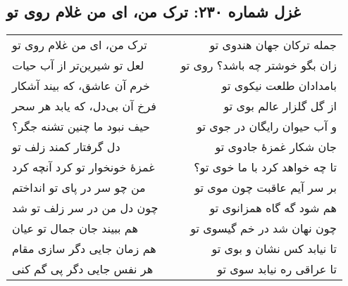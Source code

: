\begin{center}
\section*{غزل شماره ۲۳۰: ترک من، ای من غلام روی تو}
\label{sec:230}
\begin{longtable}{l p{0.5cm} r}
ترک من، ای من غلام روی تو
&&
جمله ترکان جهان هندوی تو
\\
لعل تو شیرین‌تر از آب حیات
&&
زان بگو خوشتر چه باشد؟ روی تو
\\
خرم آن عاشق، که بیند آشکار
&&
بامدادان طلعت نیکوی تو
\\
فرخ آن بی‌دل، که یابد هر سحر
&&
از گل گلزار عالم بوی تو
\\
حیف نبود ما چنین تشنه جگر؟
&&
و آب حیوان رایگان در جوی تو
\\
دل گرفتار کمند زلف تو
&&
جان شکار غمزهٔ جادوی تو
\\
غمزهٔ خونخوار تو کرد آنچه کرد
&&
تا چه خواهد کرد با ما خوی تو؟
\\
من چو سر در پای تو انداختم
&&
بر سر آیم عاقبت چون موی تو
\\
چون دل من در سر زلف تو شد
&&
هم شود گه گاه همزانوی تو
\\
هم ببیند جان جمال تو عیان
&&
چون نهان شد در خم گیسوی تو
\\
هم زمان جایی دگر سازی مقام
&&
تا نیابد کس نشان و بوی تو
\\
هر نفس جایی دگر پی گم کنی
&&
تا عراقی ره نیابد سوی تو
\\
\end{longtable}
\end{center}
